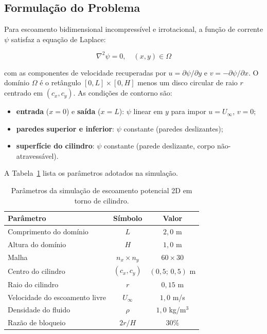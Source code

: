 \subsection{Formulação do Problema}

Para escoamento bidimensional incompressível e irrotacional, a função de corrente $\psi$ satisfaz a equação de Laplace:

\begin{equation}
    \nabla^2 \psi = 0, \quad (x, y) \in \Omega
    \label{eq:val_potencial_edp}
\end{equation}

\noindent com as componentes de velocidade recuperadas por $u = \partial \psi / \partial y$ e $v = -\partial \psi / \partial x$. O domínio $\Omega$ é o retângulo $[0, L] \times [0, H]$ menos um disco circular de raio $r$ centrado em $(c_x, c_y)$. As condições de contorno são:
\begin{itemize}
    \item \textbf{entrada} ($x = 0$) e \textbf{saída} ($x = L$): $\psi$ linear em $y$ para impor $u = U_{\infty}$, $v = 0$;
    \item \textbf{paredes superior e inferior}: $\psi$ constante (paredes deslizantes);
    \item \textbf{superfície do cilindro}: $\psi$ constante (parede deslizante, corpo não-atravessável).
\end{itemize}

A Tabela~\ref{tab:val_potencial_params} lista os parâmetros adotados na simulação.

\begin{table}[htbp]
    \centering
    \caption{Parâmetros da simulação de escoamento potencial 2D em torno de cilindro.}
    \label{tab:val_potencial_params}
    \begin{tabular}{lcc}
        \hline
        \textbf{Parâmetro} & \textbf{Símbolo} & \textbf{Valor} \\
        \hline
        Comprimento do domínio       & $L$         & $2{,}0$ m      \\
        Altura do domínio            & $H$         & $1{,}0$ m      \\
        Malha                        & $n_x \times n_y$ & $60 \times 30$ \\
        Centro do cilindro           & $(c_x, c_y)$ & $(0{,}5;\, 0{,}5)$ m \\
        Raio do cilindro             & $r$         & $0{,}15$ m     \\
        Velocidade do escoamento livre & $U_{\infty}$ & $1{,}0$ m/s \\
        Densidade do fluido          & $\rho$      & $1{,}0$ kg/m$^3$ \\
        Razão de bloqueio            & $2r / H$    & $30\%$         \\
        \hline
    \end{tabular}
\end{table}

